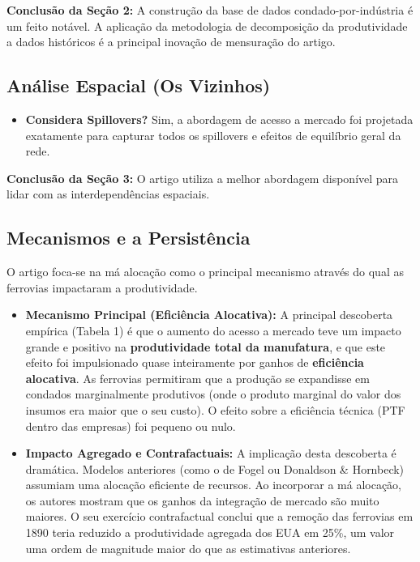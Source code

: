 \documentclass[12pt, a4paper]{article}
\begin{document}
\noindent\textbf{Conclusão da Seção 2:} A construção da base de dados condado-por-indústria é um feito notável. A aplicação da metodologia de decomposição da produtividade a dados históricos é a principal inovação de mensuração do artigo.

\subsection{Análise Espacial (Os Vizinhos)}

\begin{itemize}
    \item \textbf{Considera Spillovers?} Sim, a abordagem de acesso a mercado foi projetada exatamente para capturar todos os spillovers e efeitos de equilíbrio geral da rede.
\end{itemize}

\noindent\textbf{Conclusão da Seção 3:} O artigo utiliza a melhor abordagem disponível para lidar com as interdependências espaciais.

\subsection{Mecanismos e a Persistência}
O artigo foca-se na má alocação como o principal mecanismo através do qual as ferrovias impactaram a produtividade.
\begin{itemize}
    \item \textbf{Mecanismo Principal (Eficiência Alocativa):} A principal descoberta empírica (Tabela 1) é que o aumento do acesso a mercado teve um impacto grande e positivo na \textbf{produtividade total da manufatura}, e que este efeito foi impulsionado quase inteiramente por ganhos de \textbf{eficiência alocativa}. As ferrovias permitiram que a produção se expandisse em condados marginalmente produtivos (onde o produto marginal do valor dos insumos era maior que o seu custo). O efeito sobre a eficiência técnica (PTF dentro das empresas) foi pequeno ou nulo.
    \item \textbf{Impacto Agregado e Contrafactuais:} A implicação desta descoberta é dramática. Modelos anteriores (como o de Fogel ou Donaldson \& Hornbeck) assumiam uma alocação eficiente de recursos. Ao incorporar a má alocação, os autores mostram que os ganhos da integração de mercado são muito maiores. O seu exercício contrafactual conclui que a remoção das ferrovias em 1890 teria reduzido a produtividade agregada dos EUA em 25\%, um valor uma ordem de magnitude maior do que as estimativas anteriores.
\end{itemize}
\end{document}
